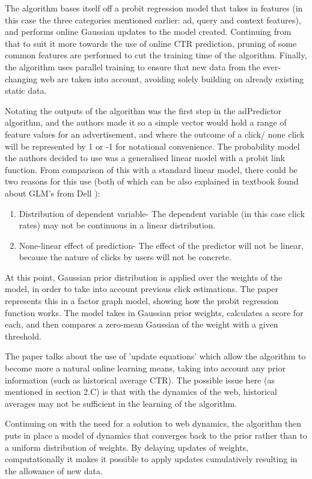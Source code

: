 \documentclass[journal]{IEEEtran}
\begin{document}
The algorithm bases itself off a probit regression model that takes in features (in this case the three categories mentioned earlier: ad, query and context features), and performs online Gaussian updates to the model created. Continuing from that to suit it more towards the use of online CTR prediction, pruning of some common features are performed to cut the training time of the algorithm. Finally, the algorithm uses parallel training to ensure that new data from the ever-changing web are taken into account, avoiding solely building on already existing static data. \par
Notating the outputs of the algorithm was the first step in the adPredictor algorithm, and the authors made it so a simple vector would hold a range of feature values for an advertisement, and where the outcome of a click/ none click will be represented by 1 or -1 for notational convenience. 
The probability model the authors decided to use was a generalised linear model with a probit link function. From comparison of this with a standard linear model, there could be two reasons for this use (both of which can be also explained in textbook found about GLM's from Dell \cite{dell}):
\begin{enumerate}
\item Distribution of dependent variable- The dependent variable (in this case click rates) may not be continuous in a linear distribution.
\item None-linear effect of prediction- The effect of the predictor will not be linear, because the nature of clicks by users will not be concrete.
\end{enumerate}
At this point, Gaussian prior distribution is applied over the weights of the model, in order to take into account previous click estimations. The paper represents this in a factor graph model, showing how the probit regression function works. The model takes in Gaussian prior weights, calculates a score for each, and then compares a zero-mean Gaussian of the weight with a given threshold. \par
The paper talks about the use of 'update equations' which allow the algorithm to become more a natural online learning means, taking into account any prior information (such as historical average CTR). The possible issue here (as mentioned in section 2.C) is that with the dynamics of the web, historical averages may not be sufficient in the learning of the algorithm. \par
Continuing on with the need for a solution to web dynamics, the algorithm then puts in place a model of dynamics that converges back to the prior rather than to a uniform distribution of weights. By delaying updates of weights, computationally it makes it possible to apply updates cumulatively resulting in the allowance of new data. \par
\end{document}
